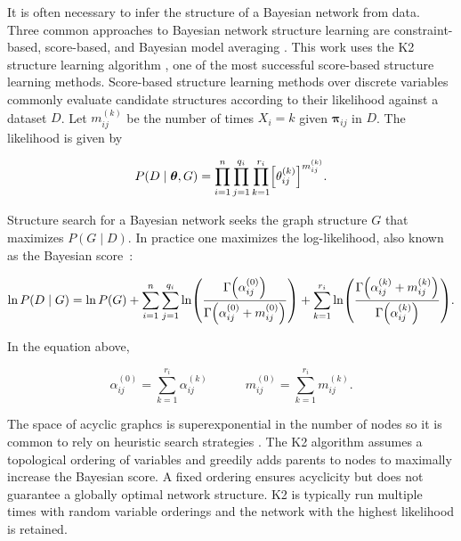 It is often necessary to infer the structure of a Bayesian network from data.
Three common approaches to Bayesian network structure learning are constraint-based, score-based, and Bayesian model averaging \citep[see][chap.~18]{PGM_2009}.
This work uses the K2 structure learning algorithm \citep{K2}, one of the most successful score-based structure learning methods.
Score-based structure learning methods over discrete variables commonly evaluate candidate structures according to their likelihood against a dataset $D$.
Let $m_{ij}^{(k)}$ be the number of times $X_i = k$ given $\bm{\pi}_{ij}$ in $D$.
The likelihood is given by

\begin{equation}
P(D\mid \bm{\theta}, G) = \prod_{i=1}^n \prod_{j=1}^{q_i} \prod_{k=1}^{r_i} \brock{\theta_{ij}^{(k)}}^{m_{ij}^{(k)}}\text{.}
\end{equation}


Structure search for a Bayesian network seeks the graph structure $G$ that maximizes ${P(G\mid D)}$.
In practice one maximizes the log-likelihood, also known as the Bayesian score~\cite{cooper1992bayesian}:

\begin{small}
\begin{equation}
\label{eq:BayesianScore}
  \ln P(D\mid G) = \ln P(G) + \sum_{i=1}^n \sum_{j=1}^{q_i} \ln\paren{
    \frac{
      \Gamma\paren{\alpha_{ij}^{(0)}}
    }{
      \Gamma\paren{\alpha_{ij}^{(0)} + m_{ij}^{(0)}}
    }
  } + \sum_{k=1}^{r_i} \ln\paren{
    \frac{
      \Gamma\paren{\alpha_{ij}^{(k)} + m_{ij}^{(k)}}
    }{
      \Gamma\paren{\alpha_{ij}^{(k)}}
    }
  }\text{.}
\end{equation}
\end{small}

In the equation above,

\begin{equation}
\alpha_{ij}^{(0)} = \sum_{k=1}^{r_i} \alpha_{ij}^{(k)} \quad \qquad m_{ij}^{(0)} = \sum_{k=1}^{r_i} m_{ij}^{(k)}\text{.}
\end{equation}

The space of acyclic graphcs is superexponential in the number of nodes so it is common to rely on heuristic search strategies \citep{PGM_2009}.
The K2 algorithm assumes a topological ordering of variables and greedily adds parents to nodes to maximally increase the Bayesian score.
A fixed ordering ensures acyclicity but does not guarantee a globally optimal network structure.
K2 is typically run multiple times with random variable orderings and the network with the highest likelihood is retained.

